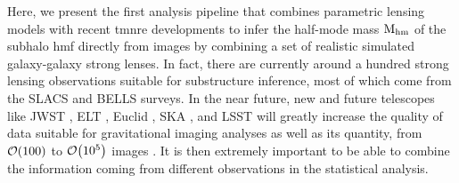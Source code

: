 Here, we present the first analysis pipeline that combines parametric lensing models with recent \gls*{tmnre} developments to infer the half-mode mass $\mathrm{M_{hm}}$ of the subhalo \gls*{hmf} directly from images by combining a set of realistic simulated galaxy-galaxy strong lenses. 
In fact, there are currently around a hundred strong lensing observations suitable for substructure inference, most of which come from the SLACS \cite{Bolton:2005nf} and BELLS \cite{BOSS:2011bef} surveys. In the near future, new and future telescopes like JWST \cite{Gardner:2006ky}, ELT \cite{Simon:2019aa}, Euclid \cite{Refregier:2010ss, EUCLID:2011zbd}, SKA \cite{Koopmans:2004gf}, and LSST \cite{LSSTDarkEnergyScience:2020oya} will greatly increase the quality of data suitable for gravitational imaging analyses as well as its quantity, from $\order{100}$ to $\order{10^5}$ images \cite{Collett:2015roa, McKean:2015aa}. It is then extremely important to be able to combine the information coming from different observations in the statistical analysis.

